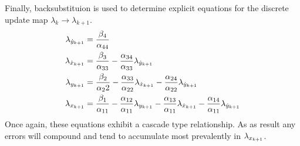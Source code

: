 \documentclass[letterpaper, preprint, paper,11pt]{AAS}	%
\begin{document}
Finally, backsubstituion is used to determine explicit equations for the discrete update map \( \lambda_k \to \lambda_{k+1} \).
\begin{subequations}\label{eq:costate_update}
\begin{align}
	\lambda_{\dot{y}_{k+1}} &= \frac{\beta_4}{\alpha_{44}} \\
	\lambda_{\dot{x}_{k+1}} &= \frac{\beta_3}{\alpha_{33}} - \frac{\alpha_{34}}{\alpha_{33}} \lambda_{\dot{y}_{k+1}} \\
	\lambda_{y_{k+1}} &= \frac{\beta_2}{\alpha_22} - \frac{\alpha_{33}}{\alpha_{22}}\lambda_{\dot{x}_{k+1}} - \frac{\alpha_{24}}{\alpha_{22}} \lambda_{\dot{y}_{k+1}} \\
	\lambda_{x_{k+1}} &= \frac{\beta_1}{\alpha_{11}} - \frac{\alpha_{12}}{\alpha_{11}} \lambda_{y_{k+1}} - \frac{\alpha_{13}}{\alpha_{11}} \lambda_{\dot{x}_{k+1}} - \frac{\alpha_{14}}{\alpha_{11}} \lambda_{\dot{y}_{k+1}} 
\end{align}
\end{subequations}
Once again, these equations exhibit a cascade type relationship. 
As as result any errors will compound and tend to accumulate most prevalently in \( \lambda_{x_{k+1}} \).
\end{document}
